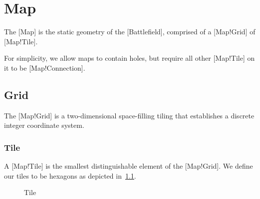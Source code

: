 \chapter{Map}\label{ch:map}

The [Map] is the static geometry of the [Battlefield], comprised of a [Map!Grid] of [Map!Tile].

For simplicity, we allow maps to contain holes, but require all other [Map!Tile] on it to be [Map!Connection].

\section{Grid}

The [Map!Grid] is a two-dimensional space-filling tiling that establishes a discrete integer coordinate system.

\subsection{Tile}

A [Map!Tile] is the smallest distinguishable element of the [Map!Grid].
We define our tiles to be hexagons as depicted in~\ref{fig:map_tile}.


\begin{figure}[htbp]
    \centering
    \caption{Tile}\label{fig:map_tile}
\end{figure}

